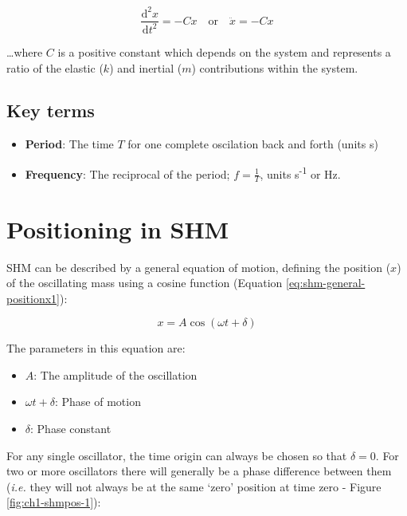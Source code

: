 \documentclass[
]{book}
\providecommand{\tightlist}{%
  \setlength{\itemsep}{0pt}\setlength{\parskip}{0pt}}
\begin{document}
\begin{equation}
\frac{\textrm{d}^2 x}{\textrm{d} t^2} = -Cx \quad\mathrm{or}\quad\ddot{x} = -Cx
\label{eq:shm-general-massonspring1}
\end{equation}

\ldots where \(C\) is a positive constant which depends on the system and represents a ratio of the elastic (\(k\)) and inertial (\(m\)) contributions within the system.

\hypertarget{key-terms}{%
\subsection{Key terms}\label{key-terms}}

\begin{itemize}
\tightlist
\item
  \textbf{Period}: The time \(T\) for one complete oscilation back and forth (units s)
\item
  \textbf{Frequency}: The reciprocal of the period; \(f = \frac{1}{T}\), units s\textsuperscript{-1} or Hz.
\end{itemize}

\hypertarget{sec:shm-position}{%
\section{Positioning in SHM}\label{sec:shm-position}}

SHM can be described by a general equation of motion, defining the position (\(x\)) of the oscillating mass using a cosine function (Equation \eqref{eq:shm-general-positionx1}):

\begin{equation}
x = A \cos (\omega t + \delta)
\label{eq:shm-general-positionx1}
\end{equation}

The parameters in this equation are:

\begin{itemize}
\tightlist
\item
  \(A\): The amplitude of the oscillation
\item
  \(\omega t + \delta\): Phase of motion
\item
  \(\delta\): Phase constant
\end{itemize}

For any single oscillator, the time origin can always be chosen so that \(\delta = 0\). For two or more oscillators there will generally be a phase difference between them (\emph{i.e.} they will not always be at the same `zero' position at time zero - Figure \ref{fig:ch1-shmpos-1}):
\end{document}
